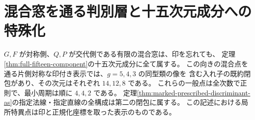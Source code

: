 \section{混合窓を通る判別層と十五次元成分への特殊化}
\label{sec:marked-mixed-component}
\begin{theorem}\label{thm:marked-mixed-component}
$G,F$ が対称側、$Q,P$ が交代側である有限の混合窓は、印を忘れても、
定理\ref{thm:full-fifteen-component}の十五次元成分に全て属する。
この向きの混合点を通る片側対称な印付き表示では、$g=5,4,3$ の同型類の像を
含む入れ子の既約閉包があり、その次元はそれぞれ $14,12,8$ である。
これらの一般点は全次数で正則で、最小周期は順に $4,4,2$ である。
定理\ref{thm:marked-prescribed-discriminant-as}の指定法線・指定直線の全構成は第二の閉包に属する。
この記述における局所特異点は印と正規化座標を取った表示のものである。
\end{theorem}
